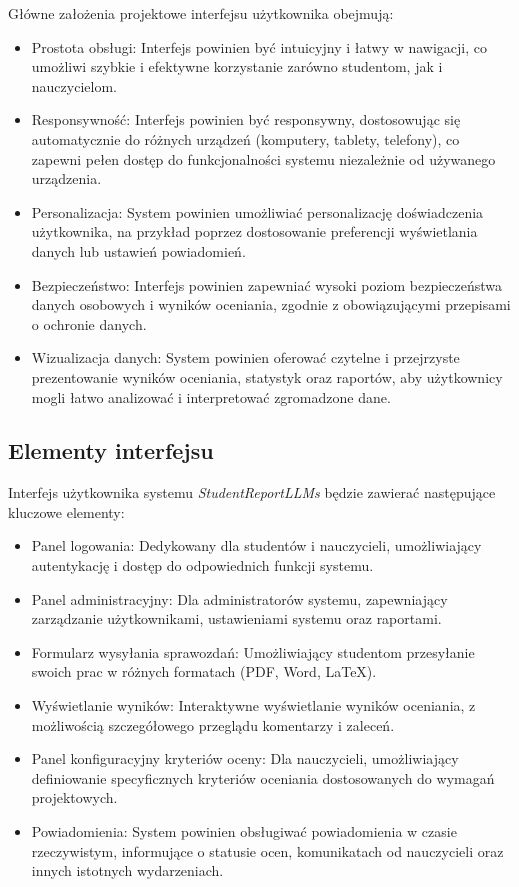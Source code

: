 \documentclass[a4paper, 12pt]{article}
\begin{document}
Główne założenia projektowe interfejsu użytkownika obejmują:

\begin{itemize}
\item Prostota obsługi: Interfejs powinien być intuicyjny i łatwy w nawigacji, co umożliwi szybkie i efektywne korzystanie zarówno studentom, jak i nauczycielom.
\item Responsywność: Interfejs powinien być responsywny, dostosowując się automatycznie do różnych urządzeń (komputery, tablety, telefony), co zapewni pełen dostęp do funkcjonalności systemu niezależnie od używanego urządzenia.
\item Personalizacja: System powinien umożliwiać personalizację doświadczenia użytkownika, na przykład poprzez dostosowanie preferencji wyświetlania danych lub ustawień powiadomień.
\item Bezpieczeństwo: Interfejs powinien zapewniać wysoki poziom bezpieczeństwa danych osobowych i wyników oceniania, zgodnie z obowiązującymi przepisami o ochronie danych.
\item Wizualizacja danych: System powinien oferować czytelne i przejrzyste prezentowanie wyników oceniania, statystyk oraz raportów, aby użytkownicy mogli łatwo analizować i interpretować zgromadzone dane.
\end{itemize}

\subsection{Elementy interfejsu}

Interfejs użytkownika systemu \textit{StudentReportLLMs} będzie zawierać następujące kluczowe elementy:

\begin{itemize}
\item Panel logowania: Dedykowany dla studentów i nauczycieli, umożliwiający autentykację i dostęp do odpowiednich funkcji systemu.
\item Panel administracyjny: Dla administratorów systemu, zapewniający zarządzanie użytkownikami, ustawieniami systemu oraz raportami.
\item Formularz wysyłania sprawozdań: Umożliwiający studentom przesyłanie swoich prac w różnych formatach (PDF, Word, LaTeX).
\item Wyświetlanie wyników: Interaktywne wyświetlanie wyników oceniania, z możliwością szczegółowego przeglądu komentarzy i zaleceń.
\item Panel konfiguracyjny kryteriów oceny: Dla nauczycieli, umożliwiający definiowanie specyficznych kryteriów oceniania dostosowanych do wymagań projektowych.
\item Powiadomienia: System powinien obsługiwać powiadomienia w czasie rzeczywistym, informujące o statusie ocen, komunikatach od nauczycieli oraz innych istotnych wydarzeniach.
\end{itemize}
\end{document}
